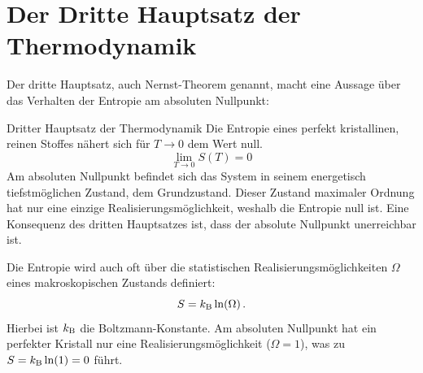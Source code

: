 \section{Der Dritte Hauptsatz der Thermodynamik}\label{sec: dritter_hauptsatz}
Der dritte Hauptsatz, auch Nernst-Theorem genannt, macht eine Aussage über das Verhalten der Entropie am absoluten Nullpunkt:
\begin{importantbox}{Dritter Hauptsatz der Thermodynamik}
    Die Entropie eines perfekt kristallinen, reinen Stoffes nähert sich für $T \to 0$ dem Wert null.
    \begin{equation}
        \lim_{T \to 0} S(T) = 0
    \end{equation}
    Am absoluten Nullpunkt befindet sich das System in seinem energetisch tiefstmöglichen Zustand, dem Grundzustand. Dieser Zustand maximaler Ordnung hat nur eine einzige Realisierungsmöglichkeit, weshalb die Entropie null ist. Eine Konsequenz des dritten Hauptsatzes ist, dass der absolute Nullpunkt unerreichbar ist.
\end{importantbox}
Die Entropie wird auch oft über die statistischen Realisierungsmöglichkeiten $\Omega$ eines makroskopischen Zustands definiert:
\begin{equation}
    S = k_{\mathrm{B}} \ln(\Omega) \,.
\end{equation}
Hierbei ist $k_{\mathrm{B}}$ die Boltzmann-Konstante. Am absoluten Nullpunkt hat ein perfekter Kristall nur eine Realisierungsmöglichkeit ($\Omega=1$), was zu $S = k_{\mathrm{B}} \ln(1) = 0$ führt.

\newpage